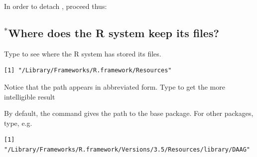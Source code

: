 In order to detach , proceed
thus:
\begin{knitrout}
\color{fgcolor}\begin{kframe}
\begin{alltt}
\hlstd{(}\hlstd{)}
\end{alltt}
\end{kframe}
\end{knitrout}

\subsection{$^*$Where does the R system keep its files?}


Type  to see where the R system has stored its files.
\begin{knitrout}
\color{fgcolor}\begin{kframe}
\begin{alltt}
\hlstd{()}
\end{alltt}
\begin{verbatim}
[1] "/Library/Frameworks/R.framework/Resources"
\end{verbatim}
\end{kframe}
\end{knitrout}
Notice that the path appears in abbreviated form.  Type
 to get the more intelligible result\\

By default, the command  gives the path to the
base package.  For other packages, type, e.g.

\begin{fullwidth}

\begin{knitrout}
\color{fgcolor}\begin{kframe}
\begin{alltt}
\hlstd{(}\hlstd{=}\hlstd{)}
\end{alltt}
\begin{verbatim}
[1] "/Library/Frameworks/R.framework/Versions/3.5/Resources/library/DAAG"
\end{verbatim}
\end{kframe}
\end{knitrout}

\end{fullwidth}

